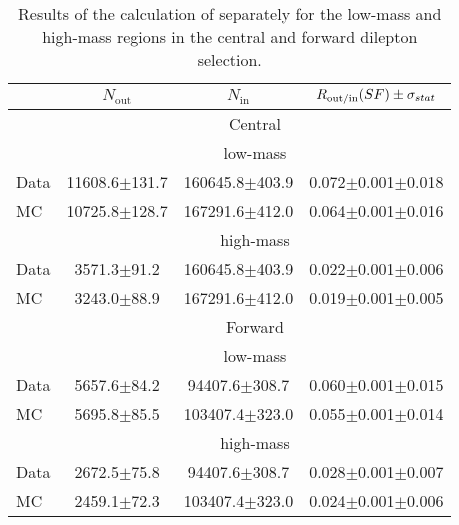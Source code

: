 
\begin{table}[hbtp]
 \renewcommand{\arraystretch}{1.3}
 \setlength{\belowcaptionskip}{6pt}
 \centering
 \caption{Results of the calculation of \Routin separately for the low-mass and high-mass regions in the central and forward dilepton selection.}
  \label{tab:rOutIn}
\begin{tabular}{l|c|c|c}     
 & $N_{\text{out}}$ & $N_{\text{in}}$ & $ R_\text{out/in} (SF) \pm \sigma_{stat}$  \\    
\hline
 & \multicolumn{3}{c}{Central} \\
\hline 
 & \multicolumn{3}{c}{low-mass}   \\ 
  Data & 11608.6$\pm$131.7 & 160645.8$\pm$403.9 & 0.072$\pm$0.001$\pm$0.018 \\
 MC & 10725.8$\pm$128.7 & 167291.6$\pm$412.0 & 0.064$\pm$0.001$\pm$0.016 \\

\hline 
& \multicolumn{3}{c}{high-mass} \\ 
\hline
 Data & 3571.3$\pm$91.2 & 160645.8$\pm$403.9 & 0.022$\pm$0.001$\pm$0.006 \\
 MC & 3243.0$\pm$88.9 & 167291.6$\pm$412.0 & 0.019$\pm$0.001$\pm$0.005 \\

 
    \hline 
& \multicolumn{3}{c}{Forward} \\
\hline 
 & \multicolumn{3}{c}{low-mass}   \\ 
  Data & 5657.6$\pm$84.2 & 94407.6$\pm$308.7 & 0.060$\pm$0.001$\pm$0.015 \\
 MC & 5695.8$\pm$85.5 & 103407.4$\pm$323.0 & 0.055$\pm$0.001$\pm$0.014 \\

\hline 
& \multicolumn{3}{c}{high-mass} \\ 
\hline
 Data & 2672.5$\pm$75.8 & 94407.6$\pm$308.7 & 0.028$\pm$0.001$\pm$0.007 \\
 MC & 2459.1$\pm$72.3 & 103407.4$\pm$323.0 & 0.024$\pm$0.001$\pm$0.006 \\


  
\end{tabular}  
\end{table}
